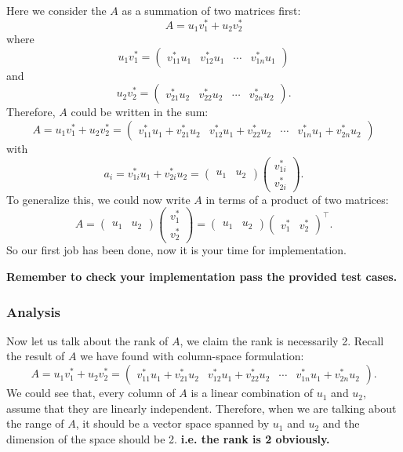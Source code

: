 \noindent Here we consider the $A$ as a summation of two matrices first:
\[
A = u_1v_1^{*} + u_2v_2^{*}
\]
where
\[
  u_1v_1^{*} = \begin{pmatrix} v_{11}^{*}u_1 & v_{12}^{*}u_1 & \cdots & v_{1n}^{*}u_1 \end{pmatrix} 
\]
and
\[
  u_2v_2^{*} = \begin{pmatrix} v_{21}^{*}u_2 & v_{22}^{*}u_2 & \cdots & v_{2n}^{*}u_2 \end{pmatrix} 
.\] 
Therefore, $A$ could be written in the sum:
\[
  A = u_1v_1^{*} + u_2v_2^{*} = \begin{pmatrix} v_{11}^{*}u_1 + v_{21}^{*}u_2 & v_{12}^{*}u_1 + v_{22}^{*}u_2 & \cdots & v_{1n}^{*}u_1 + v_{2n}^{*}u_2 \end{pmatrix} 
\]
with
\[
  a_{i} = v_{1i}^{*}u_1 + v_{2i}^{*}u_2 = \begin{pmatrix} u_1 & u_2 \end{pmatrix} \begin{pmatrix} v_{1i}^{*}\\ v_{2i}^{*} \end{pmatrix}
.\] 
To generalize this, we could now write $A$ in terms of a product of two matrices:
\[
A = \begin{pmatrix} u_1 & u_2 \end{pmatrix} \begin{pmatrix} v_{1}^{*}\\ v_{2}^{*} \end{pmatrix}   = \begin{pmatrix} u_1 & u_2 \end{pmatrix} \begin{pmatrix} v_{1}^{*} & v_{2}^{*} \end{pmatrix}^{\top}
.\]
So our first job has been done, now it is your time for implementation. \medskip

\noindent 
\textbf{Remember to check your implementation pass the provided test cases.}
\subsubsection*{Analysis}
Now let us talk about the rank of $A$, we claim the rank is necessarily 2.
Recall the result of $A$ we have found with column-space formulation: 
\[
A = u_1v_1^{*} + u_2v_2^{*} = \begin{pmatrix} v_{11}^{*}u_1 + v_{21}^{*}u_2 & v_{12}^{*}u_1 + v_{22}^{*}u_2 & \cdots & v_{1n}^{*}u_1 + v_{2n}^{*}u_2 \end{pmatrix} 
.\]
We could see that, every column of $A$ is a linear combination of $u_1$ and $u_2$, assume that they are linearly independent. Therefore, when we are talking about the range of $A$, it should be a vector space spanned by $u_1$ and $u_2$ and the dimension of the space should be 2. \textbf{i.e. the rank is 2 obviously.} \checked

